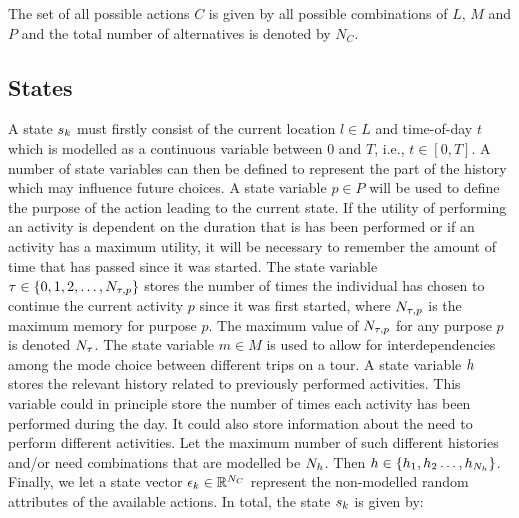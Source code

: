 The set of all possible actions $C$ is given by all possible combinations of $L$, $M$ and $P$ and the total number of alternatives is denoted by
$N_C$.
\subsection{States}
 A state $s_{k}$ must firstly consist of the current location $l \in L$ and time-of-day $t$ which is modelled as a continuous variable between 0 and $T$, i.e., $t\in [0,T]$. A number of state variables can then be defined to represent the part of the history which may influence future choices. 
A state variable $p \in P$ will be used to define the purpose of the action leading to the current state. If the utility of performing an activity is dependent on the duration that is has been performed or if an activity has a maximum utility, it will be necessary to remember the amount of time that has passed since it was started. The state variable $\tau \in \{0,1,2,\dots,N_{\tau,p} \}$ stores the number of times the individual has chosen to continue the current activity $p$ since it was first started, where $N_{\tau,p}$ is the maximum memory for purpose $p$. The maximum value of $N_{\tau,p}$ for any purpose $p$ is denoted $N_\tau$. The state variable $m \in M$ is used to allow for interdependencies among the mode choice between different trips on a tour. 
A state variable $h$ stores the relevant history related to previously performed activities. This variable could in principle store the number of times each activity has been performed during the day. It could also store information about the need to perform different activities. Let the maximum number of such different histories and/or need combinations that are modelled be $N_h$. Then $h\in\{h_1,h_2\dots,h_{N_h} \}$. Finally, we let a state vector $\epsilon_k \in \mathbb{R}^{N_C}$ represent the non-modelled random attributes of the available actions. In total, the state $s_{k}$ is given by:
